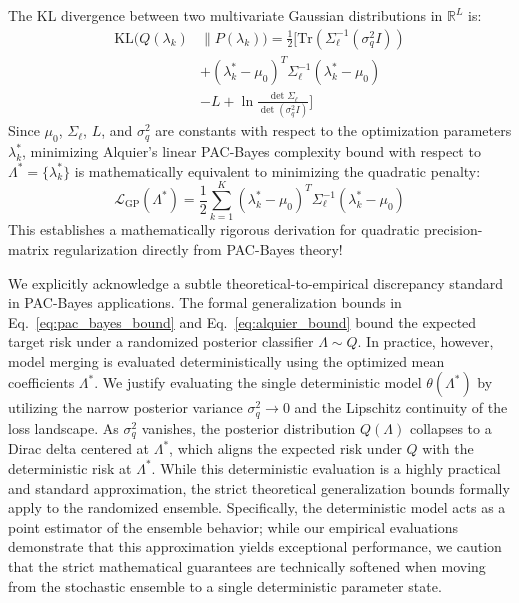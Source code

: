 The KL divergence between two multivariate Gaussian distributions in $\mathbb{R}^L$ is:
\begin{equation}
\label{eq:kl_gaussian}
\begin{aligned}
\text{KL}(Q(\lambda_k) &\| P(\lambda_k)) = \frac{1}{2} \bigg[
\text{Tr}\left(\Sigma_{\ell}^{-1} (\sigma_q^2 I)\right) \\
&+ (\lambda_k^* - \mu_0)^T \Sigma_{\ell}^{-1} (\lambda_k^* - \mu_0) \\
&- L + \ln \frac{\det \Sigma_{\ell}}{\det(\sigma_q^2 I)} \bigg]
\end{aligned}
\end{equation}
Since $\mu_0$, $\Sigma_{\ell}$, $L$, and $\sigma_q^2$ are constants with respect
to the optimization parameters $\lambda_k^*$, minimizing Alquier's linear
PAC-Bayes complexity bound with respect to $\Lambda^* = \{\lambda_k^*\}$ is
mathematically equivalent to minimizing the quadratic penalty:
\begin{equation}
\mathcal{L}_{\text{GP}}(\Lambda^*) = \frac{1}{2} \sum_{k=1}^K (\lambda_k^* -
\mu_0)^T \Sigma_{\ell}^{-1} (\lambda_k^* - \mu_0)
\label{eq:gp_penalty}
\end{equation}
This establishes a mathematically rigorous derivation for quadratic
precision-matrix regularization directly from PAC-Bayes theory!

\begin{remark}
We explicitly acknowledge a subtle theoretical-to-empirical discrepancy standard
in PAC-Bayes applications. The formal generalization bounds in
Eq.~\ref{eq:pac_bayes_bound} and Eq.~\ref{eq:alquier_bound} bound the expected
target risk under a randomized posterior classifier $\Lambda \sim Q$. In
practice, however, model merging is evaluated deterministically using the
optimized mean coefficients $\Lambda^*$. We justify evaluating the single
deterministic model $\theta(\Lambda^*)$ by utilizing the narrow posterior
variance $\sigma_q^2 \to 0$ and the Lipschitz continuity of the loss landscape.
As $\sigma_q^2$ vanishes, the posterior distribution $Q(\Lambda)$ collapses to a
Dirac delta centered at $\Lambda^*$, which aligns the expected risk under $Q$
with the deterministic risk at $\Lambda^*$. While this deterministic evaluation
is a highly practical and standard approximation, the strict theoretical
generalization bounds formally apply to the randomized ensemble. Specifically,
the deterministic model acts as a point estimator of the ensemble behavior;
while our empirical evaluations demonstrate that this approximation yields
exceptional performance, we caution that the strict mathematical guarantees are
technically softened when moving from the stochastic ensemble to a single
deterministic parameter state.
\end{remark}

